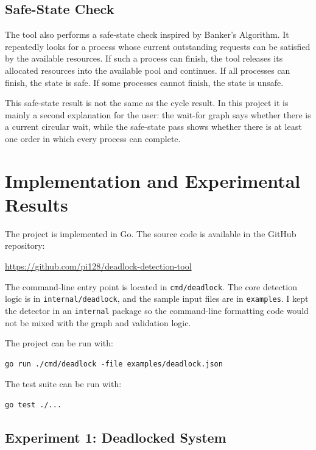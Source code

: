 \documentclass[10pt]{article}
\begin{document}
\subsection{Safe-State Check}

The tool also performs a safe-state check inspired by Banker's Algorithm. It repeatedly looks for a process whose current outstanding requests can be satisfied by the available resources. If such a process can finish, the tool releases its allocated resources into the available pool and continues. If all processes can finish, the state is safe. If some processes cannot finish, the state is unsafe.

This safe-state result is not the same as the cycle result. In this project it is mainly a second explanation for the user: the wait-for graph says whether there is a current circular wait, while the safe-state pass shows whether there is at least one order in which every process can complete.

\section{Implementation and Experimental Results}

The project is implemented in Go. The source code is available in the GitHub repository:
\begin{center}
\url{https://github.com/pi128/deadlock-detection-tool}
\end{center}
The command-line entry point is located in \texttt{cmd/deadlock}. The core detection logic is in \texttt{internal/deadlock}, and the sample input files are in \texttt{examples}. I kept the detector in an \texttt{internal} package so the command-line formatting code would not be mixed with the graph and validation logic.

The project can be run with:

\begin{lstlisting}[style=code]
go run ./cmd/deadlock -file examples/deadlock.json
\end{lstlisting}

The test suite can be run with:

\begin{lstlisting}[style=code]
go test ./...
\end{lstlisting}

\subsection{Experiment 1: Deadlocked System}
\end{document}
